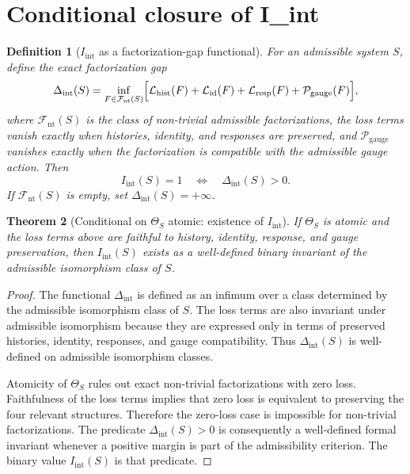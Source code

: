 \documentclass[11pt]{article}
\newtheorem{definition}{Definition}[section]
\newtheorem{theorem}[definition]{Theorem}
\newcommand{\Iint}{I_{\mathrm{int}}}
\begin{document}
\section{Conditional closure of I\_int}

\begin{definition}[$I_{\mathrm{int}}$ as a factorization-gap functional]
For an admissible system $S$, define the exact factorization gap
\[
  \Delta_{\mathrm{int}}(S)=\inf_{F\in\mathcal F_{\mathrm{nt}}(S)}
  \Bigl[\mathcal L_{\mathrm{hist}}(F)+\mathcal L_{\mathrm{id}}(F)+\mathcal L_{\mathrm{resp}}(F)+\mathcal P_{\mathrm{gauge}}(F)\Bigr],
\]
where $\mathcal F_{\mathrm{nt}}(S)$ is the class of non-trivial admissible factorizations, the loss terms vanish exactly when histories, identity, and responses are preserved, and $\mathcal P_{\mathrm{gauge}}$ vanishes exactly when the factorization is compatible with the admissible gauge action. Then
\[
  \Iint(S)=1 \quad\Longleftrightarrow\quad \Delta_{\mathrm{int}}(S)>0.
\]
If $\mathcal F_{\mathrm{nt}}(S)$ is empty, set $\Delta_{\mathrm{int}}(S)=+\infty$.
\end{definition}

\begin{theorem}[Conditional on $\Theta_S$ atomic: existence of $I_{\mathrm{int}}$]
If $\Theta_S$ is atomic and the loss terms above are faithful to history, identity, response, and gauge preservation, then $\Iint(S)$ exists as a well-defined binary invariant of the admissible isomorphism class of $S$.
\end{theorem}

\begin{proof}
The functional $\Delta_{\mathrm{int}}$ is defined as an infimum over a class determined by the admissible isomorphism class of $S$. The loss terms are also invariant under admissible isomorphism because they are expressed only in terms of preserved histories, identity, responses, and gauge compatibility. Thus $\Delta_{\mathrm{int}}(S)$ is well-defined on admissible isomorphism classes.

Atomicity of $\Theta_S$ rules out exact non-trivial factorizations with zero loss. Faithfulness of the loss terms implies that zero loss is equivalent to preserving the four relevant structures. Therefore the zero-loss case is impossible for non-trivial factorizations. The predicate $\Delta_{\mathrm{int}}(S)>0$ is consequently a well-defined formal invariant whenever a positive margin is part of the admissibility criterion. The binary value $\Iint(S)$ is that predicate.
\end{proof}
\end{document}
